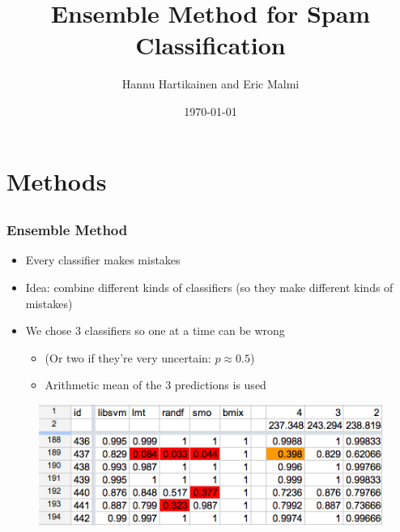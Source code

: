 \documentclass{beamer}
\title{Ensemble Method for Spam Classification}
\author{Hannu Hartikainen and Eric Malmi}
\date{\today}
\begin{document}
\setlength{\unitlength}{\textwidth}

\frame{\titlepage}

\section{Methods}
\subsection{}

\frame
{
  \frametitle{Ensemble Method}

  \begin{itemize}
    \item Every classifier makes mistakes
    \item Idea: combine different kinds of classifiers (so they make different kinds of mistakes)
    \item We chose 3 classifiers so one at a time can be wrong
    \begin{itemize}
        \item (Or two if they're very uncertain: $p \approx 0.5$)
        \item Arithmetic mean of the 3 predictions is used
    \end{itemize}
  \end{itemize}

\begin{figure}
	\centering
	\includegraphics[width=\textwidth]{spreadsheet.png}
\end{figure}
}
\end{document}
